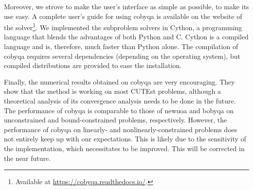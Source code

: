 Moreover, we strove to make the user's interface as simple as possible, to make its use easy.
A complete user's guide for using \gls{cobyqa} is available on the website of the solver\footnote{Available at \url{https://cobyqa.readthedocs.io/}.}.
We implemented the subproblem solvers in Cython, a programming language that blends the advantages of both Python and C.
Cython is a compiled language and is, therefore, much faster than Python alone.
The compilation of \gls{cobyqa} requires several dependencies (depending on the operating system), but compiled distributions are provided to ease the installation.

Finally, the numerical results obtained on \gls{cobyqa} are very encouraging.
They show that the method is working on most CUTEst problems, although a theoretical analysis of its convergence analysis needs to be done in the future.
The performance of \gls{cobyqa} is comparable to those of \gls{newuoa} and \gls{bobyqa} on unconstrained and bound-constrained problems, respectively.
However, the performance of \gls{cobyqa} on linearly- and nonlinearly-constrained problems does not entirely keep up with our expectations.
This is likely due to the sensitivity of the implementation, which necessitates to be improved.
This will be corrected in the near future.
